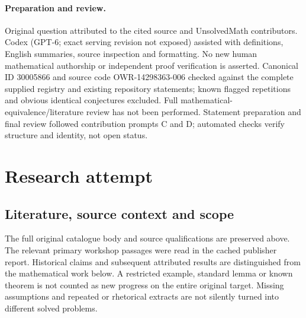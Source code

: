 \documentclass[11pt]{article}
\begin{document}
\paragraph{Preparation and review.}
Original question attributed to the cited source and UnsolvedMath contributors. Codex (GPT-6; exact serving revision not exposed) assisted with definitions, English summaries, source inspection and formatting. No new human mathematical authorship or independent proof verification is asserted. Canonical ID 30005866 and source code OWR-14298363-006 checked against the complete supplied registry and existing repository statements; known flagged repetitions and obvious identical conjectures excluded. Full mathematical-equivalence/literature review has not been performed. Statement preparation and final review followed contribution prompts C and D; automated checks verify structure and identity, not open status.
\label{end:30005866}

\section{Research attempt}
\subsection{Literature, source context and scope}
The full original catalogue body and source qualifications are preserved above. The relevant primary workshop passages were read in the cached publisher report. Historical claims and subsequent attributed results are distinguished from the mathematical work below. A restricted example, standard lemma or known theorem is not counted as new progress on the entire original target. Missing assumptions and repeated or rhetorical extracts are not silently turned into different solved problems.
\end{document}
